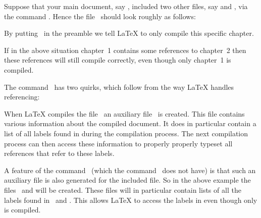 Suppose that your main document, say , included two other files, say  and , via the command .
Hence the file~ should look roughly as follows:
By putting~ in the preamble we tell {\LaTeX} to only compile this specific chapter.
If in the above situation chapter~1 contains some references to chapter~2 then these references will still compile correctly, even though only chapter~1 is compiled.

The command~ has two quirks, which follow from the way {\LaTeX} handles referencing:

When {\LaTeX} compiles the file~ an auxiliary file~ is created.
This file contains various information about the compiled document.
It does in particular contain a list of all labels found in  during the compilation process.
The next compilation process can then access these information to properly properly typeset all references that refer to these labels.

A feature of the command~ (which the command~ does not have) is that such an auxiliary file is also generated for the included file.
So in the above example the files~ and  will be created.
These files will in particular contain lists of all the labels found in~ and .
This allows {\LaTeX} to access the labels in  even though only  is compiled.

